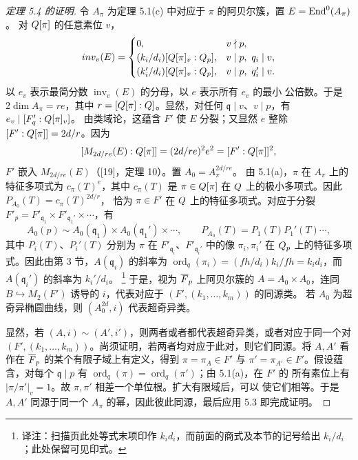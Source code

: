 \begin{proof}[定理 5.4 的证明]
令 $A_\pi$ 为定理 5.1(c) 中对应于 $\pi$ 的阿贝尔簇，置 $E=\End^0(A_\pi)$。
对 $Q[\pi]$ 的任意素位 $v$，
\[
inv_v(E)=
\begin{cases}
0,&v\nmid p,\\
(k_i/d_i)[Q[\pi]_v:Q_p],&v\mid p,\ q_i\mid v,\\
(k_i'/d_i)[Q[\pi]_v:Q_p],&v\mid p,\ q_i'\mid v.
\end{cases}
\]
以 $e_v$ 表示最简分数 $\operatorname{inv}_v(E)$ 的分母，以 $e$ 表示所有 $e_v$ 的最小
公倍数。于是 $2\dim A_\pi=re$，其中 $r=[Q[\pi]:Q]$。显然，对任何
$\mathfrak q\mid v$、$v\mid p$，有 $e_v\mid[F'_{q}:Q[\pi]_v]$。
由类域论，这蕴含 $F'$ 使 $E$ 分裂；又显然 $e$ 整除
$[F':Q[\pi]]=2d/r$。因为
\[
[M_{2d/re}(E):Q[\pi]]=(2d/re)^2e^2=[F':Q[\pi]]^2,
\]
$F'$ 嵌入 $M_{2d/re}(E)$（[19]，定理 10）。置 $A_0=A_\pi^{2d/re}$。
由 5.1(a)，$\pi$ 在 $A_\pi$ 上的特征多项式为 $c_\pi(T)^e$，其中 $c_\pi(T)$ 是
$\pi\in Q[\pi]$ 在 $Q$ 上的极小多项式。因此 $P_{A_0}(T)=c_\pi(T)^{2d/r}$，
恰为 $\pi\in F'$ 在 $Q$ 上的特征多项式。对应于分裂
$F'_p=F'_{\mathfrak q_1}\times F'_{\mathfrak q_1'}\times\cdots$，有
\[
A_0(p)\sim A_0(\mathfrak q_1)\times A_0(\mathfrak q_1')\times\cdots,
\qquad P_{A_0}(T)=P_1(T)P_1'(T)\cdots,
\]
其中 $P_i(T)$、$P_i'(T)$ 分别为 $\pi$ 在 $F'_{\mathfrak q_i}$、$F'_{\mathfrak q_i'}$
中的像 $\pi_i,\pi_i'$ 在 $Q_p$ 上的特征多项式。因此由第 3 节，$A(\mathfrak q_i)$
的斜率为 $\operatorname{ord}_q(\pi_i)=(fh/d_i)k_i/fh=k_id_i$，而
$A(\mathfrak q_i')$ 的斜率为 $k_i'/d_i$。
\footnote{译注：扫描页此处等式末项印作 $k_id_i$，而前面的商式及本节的记号给出
$k_i/d_i$；此处保留可见印式。}
于是，视为 $\overline{F}_p$ 上阿贝尔簇的 $A=A_0\times A_0$，连同
$B\hookrightarrow M_2(F')$ 诱导的 $i$，代表对应于 $(F',(k_1,\ldots,k_m))$ 的同源类。
若 $A_0$ 为超奇异椭圆曲线，则 $(A_0^{2d},i)$ 代表超奇异类。

显然，若 $(A,i)\sim(A',i')$，则两者或者都代表超奇异类，或者对应于同一个对
$(F',(k_1,\ldots,k_m))$。尚须证明，若两者均对应于此对，则它们同源。将 $A,A'$
看作在 $\overline{F}_p$ 的某个有限子域上有定义，得到
$\pi=\pi_A\in F'$ 与 $\pi'=\pi_{A'}\in F'$。假设蕴含，对每个 $\mathfrak q\mid p$
有 $\operatorname{ord}_q(\pi)=\operatorname{ord}_q(\pi')$；由 5.1(a)，在 $F'$ 的
所有素位上有 $|\pi/\pi'|_v=1$。故 $\pi,\pi'$ 相差一个单位根。扩大有限域后，可以
使它们相等。于是 $A,A'$ 同源于同一个 $A_\pi$ 的幂，因此彼此同源，最后应用 5.3
即完成证明。
\end{proof}

